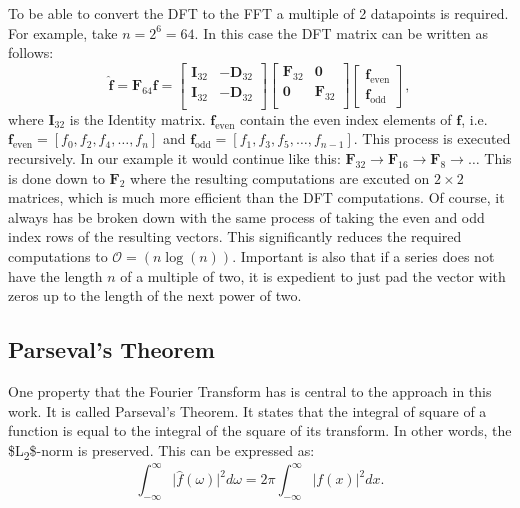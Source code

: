 \documentclass[phd,black, hidelinks]{PrincetonThesis}
\begin{document}
To be able to convert the DFT to the FFT a multiple of 2 datapoints is required. For example, take \(n=2^6=64\). In this case the DFT matrix can be written as follows:
\begin{equation}
\hat{\textbf{f}} = \textbf{F}_{64}\textbf{f} =
\begin{bmatrix}
\textbf{I}_{32} & -\textbf{D}_{32} \\
\textbf{I}_{32} & -\textbf{D}_{32} \\
\end{bmatrix}
\begin{bmatrix}
\textbf{F}_{32} & \textbf{0} \\
\textbf{0} & \textbf{F}_{32} \\
\end{bmatrix}
\begin{bmatrix}
\textbf{f}_{\text{even}} \\
\textbf{f}_{\text{odd}}
\end{bmatrix},
\end{equation}
where \(\textbf{I}_{32}\) is the Identity matrix. \(\textbf{f}_{\text{even}}\) contain the even index elements of \(\textbf{f}\), i.e. \(\textbf{f}_{\text{even}} = [f_0, f_2,f_4, \dots, f_n]\) and \(\textbf{f}_{\text{odd}}= [f_1,f_3,f_5, \dots, f_{n-1}]\). This process is executed recursively. In our example it would continue like this: \(\textbf{F}_{32} \to \textbf{F}_{16} \to \textbf{F}_{8} \to \dots\) This is done down to \(\textbf{F}_2\) where the resulting computations are excuted on \(2 \times 2\) matrices, which is much more efficient than the DFT computations. Of course, it always has be broken down with the same process of taking the even and odd index rows of the resulting vectors. This significantly reduces the required computations to \(\mathcal{O}= (n \log(n))\). Important is also that if a series does not have the length \(n\) of a multiple of two, it is expedient to just pad the vector with zeros up to the length of the next power of two.
\subsection{Parseval's Theorem}
\label{sec:org40a344c}
\label{org8d4ed6b}
One property that the Fourier Transform has is central to the approach in this work. It is called Parseval's Theorem. It states that the integral of square of a function is equal to the integral of the square of its transform. In other words, the \$L\textsubscript{2}\$-norm is preserved. This can be expressed as:
\begin{equation}
\int_{-\infty}^{\infty} \lvert \hat{f}(\omega) \rvert^2 d\omega = 2\pi \int_{-\infty}^{\infty} \lvert f(x) \rvert^2 dx.
\end{equation}
\end{document}
